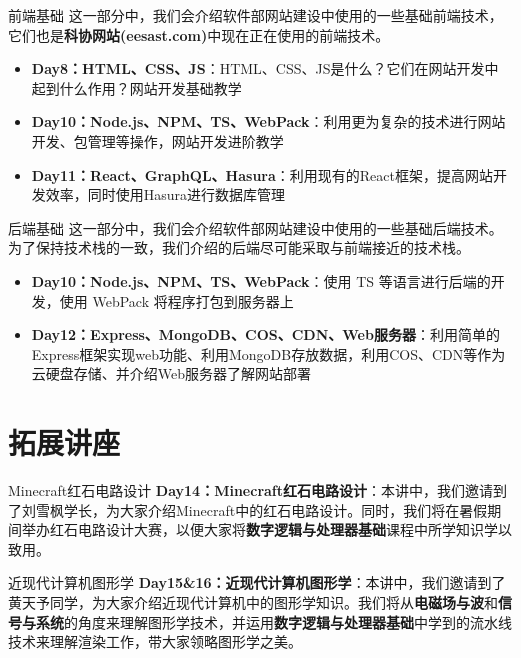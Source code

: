 \documentclass{beamer}
\begin{document}
    \begin{frame}{前端基础}
        这一部分中，我们会介绍软件部网站建设中使用的一些基础前端技术，它们也是\textbf{科协网站(eesast.com)}中现在正在使用的前端技术。
        \begin{itemize}
            \item \textbf{Day8：HTML、CSS、JS}：HTML、CSS、JS是什么？它们在网站开发中起到什么作用？网站开发基础教学
            \item \textbf{Day10：Node.js、NPM、TS、WebPack}：利用更为复杂的技术进行网站开发、包管理等操作，网站开发进阶教学
            \item \textbf{Day11：React、GraphQL、Hasura}：利用现有的React框架，提高网站开发效率，同时使用Hasura进行数据库管理
        \end{itemize}
    \end{frame}

    \begin{frame}{后端基础}
        这一部分中，我们会介绍软件部网站建设中使用的一些基础后端技术。为了保持技术栈的一致，我们介绍的后端尽可能采取与前端接近的技术栈。
        \begin{itemize}
            \item \textbf{Day10：Node.js、NPM、TS、WebPack}：使用 TS 等语言进行后端的开发，使用 WebPack 将程序打包到服务器上
            \item \textbf{Day12：Express、MongoDB、COS、CDN、Web服务器}：利用简单的Express框架实现web功能、利用MongoDB存放数据，利用COS、CDN等作为云硬盘存储、并介绍Web服务器了解网站部署
        \end{itemize}
    \end{frame}

    \section{拓展讲座}

    \begin{frame}{Minecraft红石电路设计}
        \textbf{Day14：Minecraft红石电路设计}：本讲中，我们邀请到了刘雪枫学长，为大家介绍Minecraft中的红石电路设计。同时，我们将在暑假期间举办红石电路设计大赛，以便大家将\textbf{数字逻辑与处理器基础}课程中所学知识学以致用。
    \end{frame}

    \begin{frame}{近现代计算机图形学}
        \textbf{Day15\&16：近现代计算机图形学}：本讲中，我们邀请到了黄天予同学，为大家介绍近现代计算机中的图形学知识。我们将从\textbf{电磁场与波}和\textbf{信号与系统}的角度来理解图形学技术，并运用\textbf{数字逻辑与处理器基础}中学到的流水线技术来理解渲染工作，带大家领略图形学之美。
    \end{frame}
\end{document}
